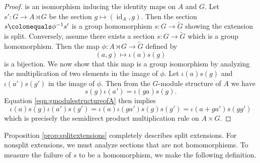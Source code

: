 \documentclass{dcthesis}
\newcommand{\defi}[1]{\textsf{#1}}
\newcommand{\wt}[1]{\widetilde{#1}}
\DeclareMathOperator{\id}{id}
\theoremstyle{definition}
\newtheorem{definition}[prop]{Definition}
\theoremstyle{remark}
\numberwithin{equation}{section}
\numberwithin{figure}{section}
\begin{document}
{{\begin{proof}
      is an isomorphism inducing the identity maps
      on $A$ and $G$.
      Let $s'\colon G\to A\rtimes G$ be the section
      $g\mapsto (\id_A,g)$.
      Then the section $s\colonequals\phi^{-1}s'$
      is a group homomorphism
      $s\colon G\to\wt{G}$
      showing the extension is split.
      Conversely,
      assume there exists
      a section
      $s\colon G\to\wt{G}$
      which is a group homomorphism.
      Then the map $\phi\colon A\rtimes G\to\wt{G}$ defined by
      \[
        (a,g)\mapsto\iota(a)s(g)
      \]
      is a bijection.
      We now show that this map is a group isomorphism
      by analyzing the multiplication of two
      elements in the image of $\phi$.
      Let $\iota(a)s(g)$ and $\iota(a')s(g')$
      in the image of $\phi$.
      Then
      from the $G$-module structure of $A$ we have
      \begin{equation}
        \label{eqn:gmodulestructureofA}
        s(g)\iota(a')=\iota(ga)s(g).
      \end{equation}
      Equation \ref{eqn:gmodulestructureofA}
      then implies
      \[
        \iota(a)s(g)\iota(a')s(g')=\iota(a)\iota(ga')s(g)s(g')=\iota(a+ga')s(gg')
      \]
      which is precisely the semidirect product multiplication
      rule on $A\times G$.
    \end{proof}
    Proposition \ref{prop:splitextensions}
    completely describes split extensions.
    For nonsplit extensions,
    we must analyze sections that are not homomorphisms.
    To measure the failure of $s$ to be a homomorphism,
    we make the following definition.
}}
\end{document}

